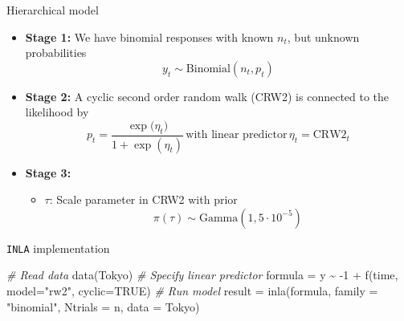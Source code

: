 \documentclass[
  handout]{beamer}
\newenvironment{Shaded}{\begin{snugshade}}{\end{snugshade}}
\newcommand{\AttributeTok}[1]{\textcolor[rgb]{0.77,0.63,0.00}{#1}}
\newcommand{\CommentTok}[1]{\textcolor[rgb]{0.56,0.35,0.01}{\textit{#1}}}
\newcommand{\ConstantTok}[1]{\textcolor[rgb]{0.00,0.00,0.00}{#1}}
\newcommand{\DecValTok}[1]{\textcolor[rgb]{0.00,0.00,0.81}{#1}}
\newcommand{\FunctionTok}[1]{\textcolor[rgb]{0.00,0.00,0.00}{#1}}
\newcommand{\NormalTok}[1]{#1}
\newcommand{\OtherTok}[1]{\textcolor[rgb]{0.56,0.35,0.01}{#1}}
\newcommand{\SpecialCharTok}[1]{\textcolor[rgb]{0.00,0.00,0.00}{#1}}
\newcommand{\StringTok}[1]{\textcolor[rgb]{0.31,0.60,0.02}{#1}}
\providecommand{\tightlist}{%
  \setlength{\itemsep}{0pt}\setlength{\parskip}{0pt}}
\begin{document}
\begin{frame}{Hierarchical model}
\protect\hypertarget{hierarchical-model}{}
\begin{itemize}
\item
  \textbf{Stage 1:} We have binomial responses with known \(n_t\), but
  unknown probabilities \[
  y_t \sim \text{Binomial}(n_t, p_t)
  \]
\item
  \textbf{Stage 2:} A cyclic second order random walk (CRW2) is
  connected to the likelihood by \[
  p_t = \frac{\exp{(\eta_t})}{1+\exp(\eta_t)}\, \text{with linear predictor}\,\eta_t = \mathrm{CRW2}_t
  \]
\item
  \textbf{Stage 3:}

  \begin{itemize}
  \tightlist
  \item
    \(\tau\): Scale parameter in CRW2 with prior \[
        \pi(\tau) \sim \text{Gamma}(1, 5\cdot 10^{-5})
    \]
  \end{itemize}
\end{itemize}
\end{frame}

\begin{frame}[fragile]{\texttt{INLA} implementation}
\protect\hypertarget{inla-implementation}{}
\begin{Shaded}
\begin{Highlighting}[]
\CommentTok{\# Read data}
\FunctionTok{data}\NormalTok{(Tokyo)}
\CommentTok{\# Specify linear predictor}
\NormalTok{formula }\OtherTok{=}\NormalTok{ y }\SpecialCharTok{\textasciitilde{}} \SpecialCharTok{{-}}\DecValTok{1} \SpecialCharTok{+} \FunctionTok{f}\NormalTok{(time, }\AttributeTok{model=}\StringTok{"rw2"}\NormalTok{, }\AttributeTok{cyclic=}\ConstantTok{TRUE}\NormalTok{)}
\CommentTok{\# Run model}
\NormalTok{result }\OtherTok{=} \FunctionTok{inla}\NormalTok{(formula,}
              \AttributeTok{family =} \StringTok{"binomial"}\NormalTok{,}
              \AttributeTok{Ntrials =}\NormalTok{ n,}
              \AttributeTok{data =}\NormalTok{ Tokyo)}
\end{Highlighting}
\end{Shaded}
\end{frame}
\end{document}
